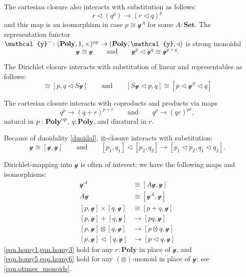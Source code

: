 \documentclass[11pt, one side, article]{memoir}
\theoremstyle{definition}
\theoremstyle{plain}
\newcommand{\Cat}[1]{\mathbf{#1}}%
\newcommand{\op}{^\tn{op}}
\newcommand{\tn}[1]{\textnormal{#1}}
\newcommand{\smset}{\Cat{Set}}
\newcommand{\yon}{\mathcal{y}}
\newcommand{\poly}{\Cat{Poly}}
\newcommand{\0}{\textsf{0}}
\newcommand{\1}{\tn{\textsf{1}}}
\newcommand{\tri}{\mathbin{\triangleleft}}
\newcommand{\qqand}{\qquad\text{and}\qquad}
\begin{document}
The cartesian closure also interacts with substitution as follows:
\begin{equation}
	r\tri (q^p)\to (r\tri q)^p
\end{equation}
and this map is an isomorphism in case $p\cong\yon^A$ for some $A:\smset$. 
The representation functor $\yon^-\colon(\poly,1,\times)\op\to(\poly,\yon,\tri)$ is strong monoidal
\begin{equation}
	\yon\cong\yon
	\qqand
	\yon^p\tri\yon^q\cong\yon^{p\times q}.
\end{equation}


The Dirichlet closure interacts with substitution of linear and representables as follows:
\begin{equation}
  [p\tri \yon^S,q]\cong[p,q\tri S\yon]
  \qqand
  [S\yon\tri p,q]\cong[p\tri\yon^S\tri q]
\end{equation}

The cartesian closure interacts with coproducts and products via maps
\begin{equation}
  q^p\to(q+r)^{p+r}
  \qqand
	q^p\to(qr)^{pr},
\end{equation}
natural in $p:\poly\op$, $q:\poly$, and dinatural in $r$.


Because of duoidality \eqref{duoidal}, $\otimes$-closure interacts with substitution:
\begin{equation}\label{eqn.shapiro_1}
	\yon\cong[\yon,\yon]
	\qqand
	[p_1,q_1]\tri[p_2,q_2]\to [p_1\tri p_2,q_1\tri q_2].
\end{equation}


Dirichlet-mapping into $\yon$ is often of interest; we have the following maps and isomorphisms:
\begin{align}
\label{eqn.homy2}
  \yon^A&\cong[A\yon,\yon]\\
\label{eqn.homy4}
  A\yon&\cong[\yon^A,\yon]\\
\label{eqn.homy1}
  [p,\yon]\times[q,\yon]&\cong[p+q,\yon]\\
\label{eqn.homy3}
  [p,\yon]+[q,\yon]&\to[pq,\yon]\\
\label{eqn.homy5}
	[p,\yon]\otimes[q,\yon]&\to[p\otimes q,\yon]\\
\label{eqn.homy6}
	[p,\yon]\tri[q,\yon]&\to[p\tri q,\yon]
\end{align}
\cref{eqn.homy1,eqn.homy3} hold for any $r:\poly$ in place of $\yon$, and \cref{eqn.homy5,eqn.homy6} hold for any $(\otimes)$-monoid in place of $\yon$; see \cref{eqn.otimes_monoids}.
\end{document}
